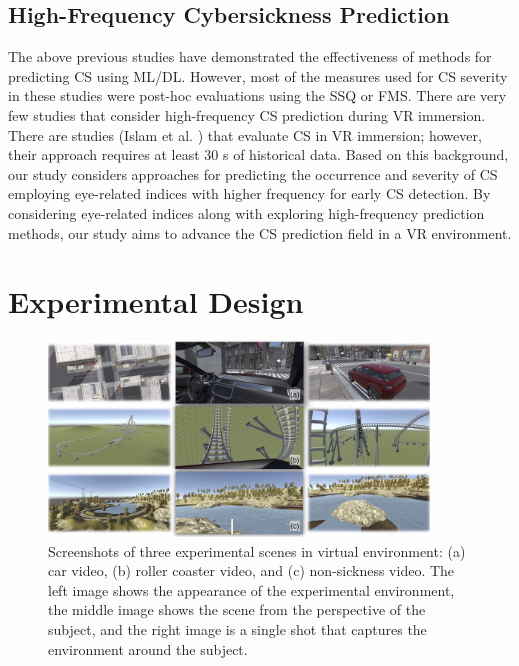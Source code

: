 \documentclass{ieeeaccess}
\begin{document}
\subsection{High-Frequency Cybersickness Prediction}
The above previous studies have demonstrated the effectiveness of methods for predicting CS using ML/DL. However, most of the measures used for CS severity in these studies were post-hoc evaluations using the SSQ or FMS. There are very few studies that consider high-frequency CS prediction during VR immersion. There are studies (Islam et al. \cite{Islam_2021}) that evaluate CS in VR immersion; however, their approach requires at least 30 s of historical data. Based on this background, our study considers approaches for predicting the occurrence and severity of CS employing eye-related indices with higher frequency for early CS detection. By considering eye-related indices along with exploring high-frequency prediction methods, our study aims to advance the CS prediction field in a VR environment.

\section{Experimental Design}%


\begin{figure}[t!]
  \centering
  \includegraphics[width=0.9\textwidth]{Experimental_Image.jpg}
  \caption{Screenshots of three experimental scenes in virtual environment: (a) car video, (b) roller coaster video, and (c) non-sickness video. The left image shows the appearance of the experimental environment, the middle image shows the scene from the perspective of the subject, and the right image is a single shot that captures the environment around the subject.}
  \label{fig1}
\end{figure}
\end{document}
